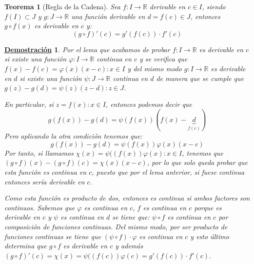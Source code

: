 \documentclass[10pt,a4paper,openright]{book}
\theoremstyle{break}
\newtheorem{theo}{Teorema}[chapter]
\newtheorem*{demo}{\underline{Demostración}}
\begin{document}
\begin{theo}[Regla de la Cadena]
Sea $f: I \rightarrow \mathbb R $ derivable en $c\in I$, siendo $f(I)\subset J$ y $g: J\rightarrow \mathbb R$ una función derivable en $d=f(c)\in J$, entonces $g\circ f (x)$ es derivable en $c$ y:
$$(g\circ f)'(c)=g'(f(c))\cdot f'(c)$$
\end{theo}
\begin{demo}
Por el lema que acabamos de probar $f: I\rightarrow \mathbb R$ es derivable en $c$ si existe una función $\varphi: I\rightarrow \mathbb R$ continua en $c$ y se verifica que $f(x)-f(c)=\varphi(x)(x-c): x\in I$ y del mismo modo $g: I\rightarrow \mathbb R$ es derivable en $d$ si existe una función $\psi: J\rightarrow \mathbb R$ continua en $d$ de manera que se cumple que $g(z)-g(d)=\psi(z)(z-d): z\in J$.

En particular, si $z= f(x): x\in I$, entonces podemos decir que
$$g(f(x))-g(d)=\psi(f(x))(f(x)-\underbrace{d}_{f(c)})$$
Pero aplicando la otra condición tenemos que:
$$g(f(x))-g(d)=\psi(f(x))\varphi(x)(x-c)$$
Por tanto, si llamamos $\chi(x)= \psi((f(x))\varphi(x): x\in I$, tenemos que $(g\circ f)(x)-(g\circ f)(c)=\chi(x)(x-c)$, por lo que solo queda probar que esta función es continua en $c$, puesto que por el lema anterior, si fuese continua entonces sería derivable en $c$.

Como esta función es producto de dos, entonces es continua si ambos factores son continuos. Sabemos que $\varphi$ es continua en $c$, $f$ es continua en $c$ porque es derivable en $c$ y $\psi$ es continua en $d$ se tiene que: $\psi \circ f$ es continua en $c$ por composición de funciones continuas. Del mismo modo, por ser producto de funciones continuas se tiene que $(\psi \circ f)\cdot \varphi$ es continua en $c$ y esto último determina que $g\circ f$ es derivable en $c$ y además $(g\circ f)'(c)=\chi(x)= \psi((f(c))\varphi(c)=g'(f(c))\cdot f'(c)$.
\end{demo}
\end{document}
